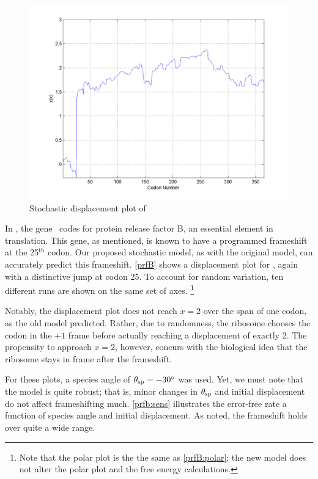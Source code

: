 \documentclass[12pt]{article}
\numberwithin{equation}{section}
\begin{document}
\begin{figure}
  \centering
  \caption{Stochastic displacement plot of \prfB}
  \label{prfB}
  \includegraphics[scale=0.4]{prfB/disp}
\end{figure}

In \ecoli, the gene \prfB\ codes for protein release factor B, an essential element in translation.
This gene, as mentioned, is known to have a programmed frameshift at
the 25$^{\textrm{th}}$ codon.
Our proposed stochastic model, as with the original model, can accurately predict this frameshift.
\autoref{prfB} shows a displacement plot for \prfB, again with a distinctive jump at codon 25.
To account for random variation, ten different runs are shown on the same set of axes.
\footnote{Note that the polar plot is the the same as \autoref{prfB:polar}; 
the new model does not alter the polar plot and the free energy calculations.}

Notably, the displacement plot does not reach $x=2$ over the span of one codon, as the old model predicted.
Rather, due to randomness, the ribosome chooses the codon in the $+1$ frame before actually reaching a displacement of exactly 2.
The propensity to approach $x=2$, however, concurs with the biological idea that the ribosome stays in frame after the frameshift.

For these plots, a species angle of $\theta_{\rm{sp}} =-30^\circ$ was used.
Yet, we must note that the model is quite robust; that is, minor changes
in $\theta_{\rm{sp}}$ and initial displacement do not affect frameshifting much.
\autoref{prfb:sens} illustrates the error-free rate
a function of species angle and initial displacement.  As noted,
the frameshift holds over quite a wide range.
\end{document}
